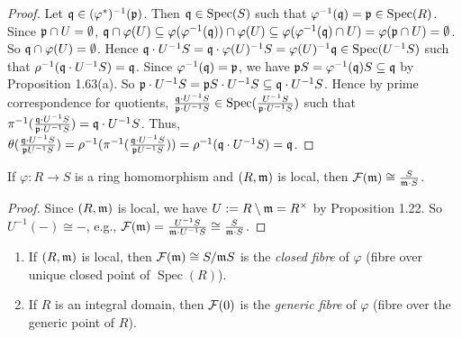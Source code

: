 \begin{proof}
    Let $\mathfrak{q} \in (\varphi^*)^{-1}(\mathfrak{p})$. Then $\mathfrak{q} \in \operatorname{Spec}(S)$ such that $\varphi^{-1}(\mathfrak{q}) = \mathfrak{p} \in \operatorname{Spec}(R)$. Since $\mathfrak{p} \cap U = \emptyset$, $\mathfrak{q} \cap \varphi(U) \subseteq \varphi(\varphi^{-1}(\mathfrak{q})) \cap \varphi(U) \subseteq \varphi(\varphi^{-1}(\mathfrak{q}) \cap U) = \varphi(\mathfrak{p} \cap U) = \emptyset$. So $\mathfrak{q} \cap \varphi(U) = \emptyset$. Hence $\mathfrak{q} \cdot U^{-1}S = \mathfrak{q} \cdot \varphi(U)^{-1}S = \varphi(U)^{-1} \mathfrak{q} \in \operatorname{Spec}(U^{-1}S)$ such that $\rho^{-1}(\mathfrak{q} \cdot U^{-1}S) = \mathfrak{q}$. Since $\varphi^{-1}(\mathfrak{q}) = \mathfrak{p}$, we have $\mathfrak{p} S = \varphi^{-1}(\mathfrak{q})S \subseteq \mathfrak{q}$ by Proposition 1.63(a). So $\mathfrak{p} \cdot U^{-1}S = \mathfrak{p} S \cdot U^{-1}S \subseteq \mathfrak{q} \cdot U^{-1}S$. Hence by prime correspondence for quotients, $\frac{\mathfrak{q} \cdot U^{-1}S}{\mathfrak{p} \cdot U^{-1}S} \in \operatorname{Spec}(\frac{U^{-1}S}{\mathfrak{p} \cdot U^{-1}S})$ such that $\pi^{-1}(\frac{\mathfrak{q} \cdot U^{-1}S}{\mathfrak{p} \cdot U^{-1}S}) = \mathfrak{q} \cdot U^{-1}S$. Thus, $\theta(\frac{\mathfrak{q} \cdot U^{-1}S}{\mathfrak{p} U^{-1}S}) = \rho^{-1}(\pi^{-1}(\frac{\mathfrak{q} \cdot U^{-1}S}{\mathfrak{p} U^{-1}S})) = \rho^{-1}(\mathfrak{q} \cdot U^{-1}S) = \mathfrak{q}$.
    \qedhere
\end{proof}

\begin{proposition}
    If $\varphi:R \to S$ is a ring homomorphism and $(R,\mathfrak{m})$ is local, then $\mathcal{F}(\mathfrak{m}) \cong \frac{S}{\mathfrak{m} \cdot S}$.
\end{proposition}

\begin{proof}
    Since $(R,\mathfrak{m})$ is local, we have $U := R \setminus \mathfrak{m} = R^\times$ by Proposition 1.22. So $U^{-1}(-) \cong -$, e.g., $\mathcal{F}(\mathfrak{m}) = \frac{U^{-1}S}{\mathfrak{m} \cdot U^{-1}S} \cong \frac{S}{\mathfrak{m} \cdot S}$.
\end{proof}

\begin{definition}
    \begin{enumerate}
        \item If $(R,\mathfrak{m})$ is local, then $\mathcal{F}(\mathfrak{m}) \cong S/\mathfrak{m} S$ is the \emph{closed fibre} of $\varphi$ (fibre over unique closed point of $\operatorname{Spec}(R)$).
        \item 
            If $R$ is an integral domain, then $\mathcal{F}(0)$ is the \emph{generic fibre} of $\varphi$ (fibre over the generic point of $R$).
    \end{enumerate}
\end{definition}

